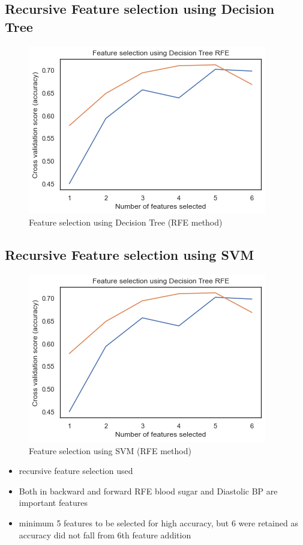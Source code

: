 \documentclass[12pt, letter]{article}
\begin{document}
\pagebreak

\noindent
\subsection{Recursive Feature selection using Decision Tree}
\begin{figure}[h]
    \centering
    \includegraphics[scale = 0.7]{FS_Dtree.png}
    \caption{Feature selection using Decision Tree (RFE method)}
    \label{FS_entropy}
\end{figure}

\noindent
\subsection{Recursive Feature selection using SVM}
\begin{figure}[h]
    \centering
    \includegraphics[scale = 0.7]{FS_Dtree.png}
    \caption{Feature selection using SVM (RFE method)}
    \label{FS_entropy}
\end{figure}

\noindent
\begin{itemize}
    \item recursive feature selection used 
    \item Both in backward and forward RFE blood sugar and Diastolic BP are important features 
    \item minimum 5 features to be selected for high accuracy, but 6 were retained as accuracy did not fall from 6th feature addition
\end{itemize}
\end{document}
